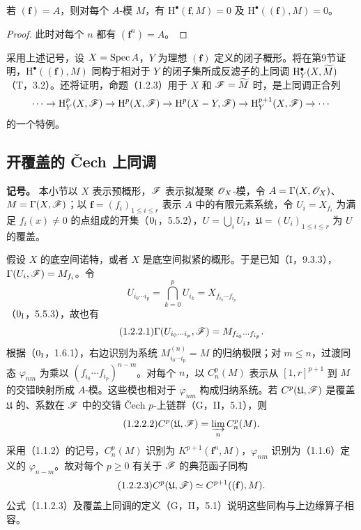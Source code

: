 若 $(\mathbf f)=A$，则对每个 $A$-模 $M$，有 $\mathrm H^\bullet(\mathbf f,M)=0$ 及 $\mathrm H^\bullet((\mathbf f),M)=0$。
\begin{proof}此时对每个 $n$ 都有 $(\mathbf f^n)=A$。\end{proof}

采用上述记号，设 $X=\operatorname{Spec} A$，$Y$ 为理想 $(\mathbf f)$ 定义的闭子概形。将在第9节证明，$\mathrm H^\bullet((\mathbf f),M)$ 同构于相对于 $Y$ 的闭子集所成反滤子的上同调 $\mathrm H_Y^\bullet(X,\widetilde{M})$（T，3.2）。还将证明，命题（1.2.3）用于 $X$ 和 $\mathscr F=\widetilde{M}$ 时，是上同调正合列
\[
\cdots\to\mathrm H_Y^p(X,\mathscr F)\to\mathrm H^p(X,\mathscr F)\to\mathrm H^p(X-Y,\mathscr F)
\to\mathrm H_Y^{p+1}(X,\mathscr F)\to\cdots
\]
的一个特例。

\subsection{开覆盖的 Čech 上同调}
\textbf{记号。}
本小节以 $X$ 表示预概形，$\mathscr F$ 表示拟凝聚 $\mathscr O_X$-模，令 $A=\Gamma(X,\mathscr O_X)$、$M=\Gamma(X,\mathscr F)$；以 $\mathbf f=(f_i)_{1\leq i\leq r}$ 表示 $A$ 中的有限元素系统，令 $U_i=X_{f_i}$ 为满足 $f_i(x)\ne0$ 的点组成的开集（$0_{\mathrm I}$，5.5.2），$U=\bigcup_iU_i$，$\mathfrak U=(U_i)_{1\leq i\leq r}$ 为 $U$ 的覆盖。

假设 $X$ 的底空间诺特，或者 $X$ 是底空间拟紧的概形。于是已知（I，9.3.3），$\Gamma(U_i,\mathscr F)=M_{f_i}$。令
\[
U_{i_0\cdots i_p}=\bigcap_{k=0}^pU_{i_k}=X_{f_{i_0}\cdots f_{i_p}}
\]
（$0_{\mathrm I}$，5.5.3），故也有
\begin{equation}\tag{1.2.2.1}
\Gamma(U_{i_0\cdots i_p},\mathscr F)=M_{f_{i_0}\cdots f_{i_p}}.
\end{equation}
根据（$0_{\mathrm I}$，1.6.1），右边识别为系统 $M^{(n)}_{i_0\cdots i_p}=M$ 的归纳极限；对 $m\leq n$，过渡同态 $\varphi_{nm}$ 为乘以 $(f_{i_0}\cdots f_{i_p})^{n-m}$。对每个 $n$，以 $C_n^p(M)$ 表示从 $[1,r]^{p+1}$ 到 $M$ 的交错映射所成 $A$-模。这些模也相对于 $\varphi_{nm}$ 构成归纳系统。若 $C^p(\mathfrak U,\mathscr F)$ 是覆盖 $\mathfrak U$ 的、系数在 $\mathscr F$ 中的交错 Čech $p$-上链群（G，II，5.1），则
\begin{equation}\tag{1.2.2.2}
C^p(\mathfrak U,\mathscr F)=\varinjlim_n C_n^p(M).
\end{equation}
采用（1.1.2）的记号，$C_n^p(M)$ 识别为 $K^{p+1}(\mathbf f^n,M)$，$\varphi_{nm}$ 识别为（1.1.6）定义的 $\varphi_{n-m}$。故对每个 $p\geq0$ 有关于 $\mathscr F$ 的典范函子同构
\begin{equation}\tag{1.2.2.3}
C^p(\mathfrak U,\mathscr F)\simeq C^{p+1}((\mathbf f),M).
\end{equation}
公式（1.1.2.3）及覆盖上同调的定义（G，II，5.1）说明这些同构与上边缘算子相容。

